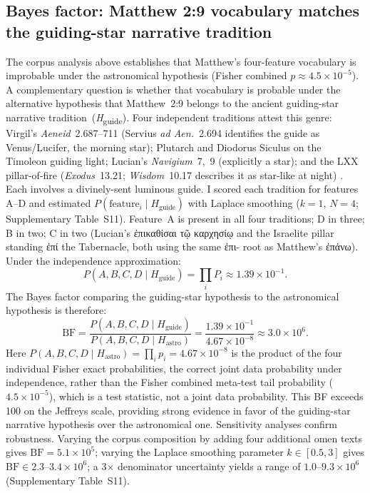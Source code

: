 \documentclass[sn-nature]{sn-jnl}
\newcommand{\grk}[1]{{\fontencoding{LGR}\selectfont #1}}
\newcommand{\grk}[1]{{\greekfont #1}}
\begin{document}
\subsection{Bayes factor: Matthew 2:9 vocabulary matches the guiding-star
  narrative tradition}\label{subsec:bayes}

The corpus analysis above establishes that Matthew's four-feature vocabulary
is improbable under the astronomical hypothesis (Fisher combined $p \approx 4.5\times10^{-5}$).
A complementary question is whether that vocabulary is probable under the
alternative hypothesis that Matthew~2:9 belongs to the ancient guiding-star
narrative tradition~(\textit{H}\textsubscript{guide}). Four independent traditions
attest this genre: Virgil's \textit{Aeneid}~2.687--711 (Servius \textit{ad
Aen.}~2.694 identifies the guide as Venus/Lucifer, the morning star); Plutarch
and Diodorus Siculus on the Timoleon guiding light; Lucian's
\textit{Navigium}~7,~9 (explicitly a star); and the LXX pillar-of-fire
(\textit{Exodus}~13.21; \textit{Wisdom}~10.17 describes it as star-like at night) 
\cite{adair2012,adair_jsnt,heilen2015}. Each involves a divinely-sent luminous guide.
I scored each tradition for features A--D and estimated
$P(\text{feature}_i \mid H_\text{guide})$ with Laplace smoothing
($k=1$, $N=4$; Supplementary Table~S11).
Feature~A is present in all four traditions; D in three; B in two;
C in two (Lucian's \grk{ἐπικαθίσαι τῷ καρχησίῳ} and the Israelite pillar standing \grk{ἐπί} 
the Tabernacle, both using the same \grk{ἐπι-} root as Matthew's \grk{ἐπάνω}).
Under the independence approximation:
\begin{equation}
  P(A,B,C,D \mid H_\text{guide}) = \prod_{i} P_i \approx 1.39\times10^{-1}.
  \label{eq:pguide}
\end{equation}
The Bayes factor comparing the guiding-star hypothesis to the astronomical
hypothesis is therefore:
\begin{equation}
  \mathrm{BF} = \frac{P(A,B,C,D \mid H_\text{guide})}
                      {P(A,B,C,D \mid H_\text{astro})}
             = \frac{1.39\times10^{-1}}{4.67\times10^{-8}}
             \approx 3.0\times10^{6}.
  \label{eq:bf}
\end{equation}
Here $P(A,B,C,D\mid H_\text{astro}) = \prod_i p_i = 4.67\times10^{-8}$ is
the product of the four individual Fisher exact probabilities, the correct
joint data probability under independence, rather than the Fisher combined
meta-test tail probability ($4.5\times10^{-5}$), which is a test statistic,
not a joint data probability.
This BF exceeds 100 on the Jeffreys scale, providing strong evidence in favor of
the guiding-star narrative hypothesis over the astronomical one. Sensitivity analyses confirm robustness. Varying the corpus composition by
adding four additional omen texts gives $\mathrm{BF} = 5.1\times10^{5}$; varying the
Laplace smoothing parameter $k \in [0.5, 3]$ gives
$\mathrm{BF} \in 2.3$--$3.4\times10^{6}$; a 3$\times$ denominator uncertainty
yields a range of $1.0$--$9.3\times10^{6}$
(Supplementary Table~S11).
\end{document}
